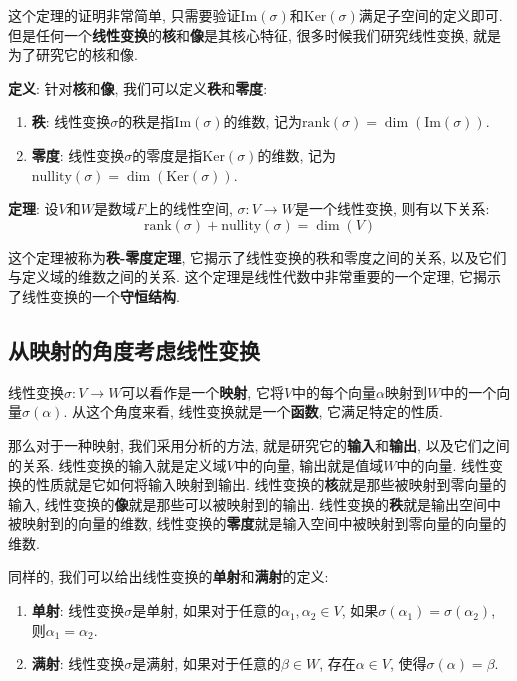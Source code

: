 \documentclass{ctexart}
\begin{document}
这个定理的证明非常简单, 只需要验证$\text{Im}(\sigma)$和$\text{Ker}(\sigma)$满足子空间的定义即可. 但是任何一个\textbf{线性变换}的\textbf{核}和\textbf{像}是其核心特征, 很多时候我们研究线性变换, 就是为了研究它的核和像.

\textbf{定义}: 针对\textbf{核}和\textbf{像}, 我们可以定义\textbf{秩}和\textbf{零度}:

\begin{enumerate}
    \item \textbf{秩}: 线性变换$\sigma$的秩是指$\text{Im}(\sigma)$的维数, 记为$\text{rank}(\sigma) = \dim(\text{Im}(\sigma))$.
    \item \textbf{零度}: 线性变换$\sigma$的零度是指$\text{Ker}(\sigma)$的维数, 记为$\text{nullity}(\sigma) = \dim(\text{Ker}(\sigma))$.
\end{enumerate}

\textbf{定理}: 设$V$和$W$是数域$F$上的线性空间, $\sigma: V \to W$是一个线性变换, 则有以下关系:
$$\text{rank}(\sigma) + \text{nullity}(\sigma) = \dim(V)$$

这个定理被称为\textbf{秩-零度定理}, 它揭示了线性变换的秩和零度之间的关系, 以及它们与定义域的维数之间的关系. 这个定理是线性代数中非常重要的一个定理, 它揭示了线性变换的一个\textbf{守恒结构}.

\subsection{从映射的角度考虑线性变换}

线性变换$\sigma: V \to W$可以看作是一个\textbf{映射}, 它将$V$中的每个向量$\alpha$映射到$W$中的一个向量$\sigma(\alpha)$. 从这个角度来看, 线性变换就是一个\textbf{函数}, 它满足特定的性质.

那么对于一种映射, 我们采用分析的方法, 就是研究它的\textbf{输入}和\textbf{输出}, 以及它们之间的关系. 线性变换的输入就是定义域$V$中的向量, 输出就是值域$W$中的向量. 线性变换的性质就是它如何将输入映射到输出. 线性变换的\textbf{核}就是那些被映射到零向量的输入, 线性变换的\textbf{像}就是那些可以被映射到的输出. 线性变换的\textbf{秩}就是输出空间中被映射到的向量的维数, 线性变换的\textbf{零度}就是输入空间中被映射到零向量的向量的维数.

同样的, 我们可以给出线性变换的\textbf{单射}和\textbf{满射}的定义:

\begin{enumerate}
    \item \textbf{单射}: 线性变换$\sigma$是单射, 如果对于任意的$\alpha_1, \alpha_2 \in V$, 如果$\sigma(\alpha_1) = \sigma(\alpha_2)$, 则$\alpha_1 = \alpha_2$.
    \item \textbf{满射}: 线性变换$\sigma$是满射, 如果对于任意的$\beta \in W$, 存在$\alpha \in V$, 使得$\sigma(\alpha) = \beta$.
\end{enumerate}
\end{document}
